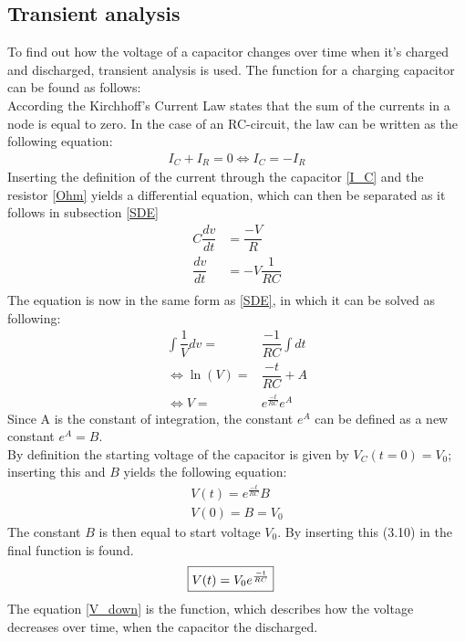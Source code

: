 \subsection{Transient analysis}
\label{sec371}
To find out how the voltage of a capacitor changes over time when it's charged and discharged, transient analysis is used. The function for a charging capacitor can be found as follows:
\\
According the Kirchhoff's Current Law states that the sum of the currents in a node is equal to zero. In the case of an RC-circuit, the law can be written as the following equation:
\begin{align*}
I_{C}+I_{R}=0 \Leftrightarrow 
I_{C}= -I_{R}
\end{align*}
Inserting the definition of the current through the capacitor \eqref{I_C} and the resistor \eqref{Ohm} yields a differential equation, which can then be separated as it follows in subsection \ref{SDE}
\begin{align*}
C \dfrac{dv}{dt}&=\dfrac{-V}{R} \\
\dfrac{dv}{dt} &= -V\dfrac{1}{RC} \\
\end{align*}
The equation is now in the same form as \eqref{SDE}, in which it can be solved as following:
\begin{align*}
\int \dfrac{1}{V}dv =& \dfrac{-1}{RC} \int dt \\
\Leftrightarrow \ln(V) =& \dfrac{-t}{RC} + A \\
\Leftrightarrow V =& e^{\frac{-t}{RC}}e^{A}
\end{align*}
Since A is the constant of integration, the constant $e^A$ can be defined as a new constant $e^A=B$.
\\
By definition the starting voltage of the capacitor is given by $V_C(t=0)=V_0$; inserting this and $B$ yields the following equation: 
\begin{align}
V(t)= e^{\frac{-t}{RC}}B \\
V(0)= B = V_0
\end{align}
The constant $B$ is then equal to start voltage $V_0$. By inserting this (3.10) in the final function is found.
\begin{align}
\label{V_down}
\Aboxed{
 V(t) = V_0e^{\frac{-t}{RC}}
 }
\end{align}
The equation \eqref{V_down} is the function, which describes how the voltage decreases over time, when the capacitor the discharged.
\\
\\
